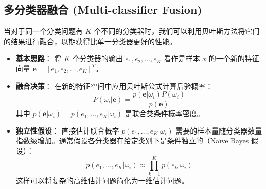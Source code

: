 \documentclass[a4paper, 11pt]{ctexart}
\begin{document}
\subsection{多分类器融合 (Multi-classifier Fusion)}
当对于同一个分类问题有 $K$ 个不同的分类器时，我们可以利用贝叶斯方法将它们的结果进行融合，以期获得比单一分类器更好的性能。

\begin{itemize}
    \item \textbf{基本思路}：
    将 $K$ 个分类器的输出 $e_1, e_2, \dots, e_K$ 看作是样本 $x$ 的一个新的特征向量 $ \mathbf{e} = [e_1, e_2, \dots, e_K]^T $。
    \item \textbf{融合决策}：
    在新的特征空间中应用贝叶斯公式计算后验概率：
    \begin{equation}
        P(\omega_i | \mathbf{e}) = \frac{p(\mathbf{e} | \omega_i) P(\omega_i)}{p(\mathbf{e})}
    \end{equation}
    其中 $p(\mathbf{e} | \omega_i) = p(e_1, \dots, e_K | \omega_i)$ 是联合类条件概率密度。
    \item \textbf{独立性假设}：
    直接估计联合概率 $p(e_1, \dots, e_K | \omega_i)$ 需要的样本量随分类器数量指数级增加。通常假设各分类器在给定类别下是条件独立的（Naïve Bayes 假设）：
    \begin{equation}
        p(e_1, \dots, e_K | \omega_i) \approx \prod_{k=1}^K p(e_k | \omega_i)
    \end{equation}
    这样可以将复杂的高维估计问题简化为一维估计问题。
\end{itemize}
\end{document}
